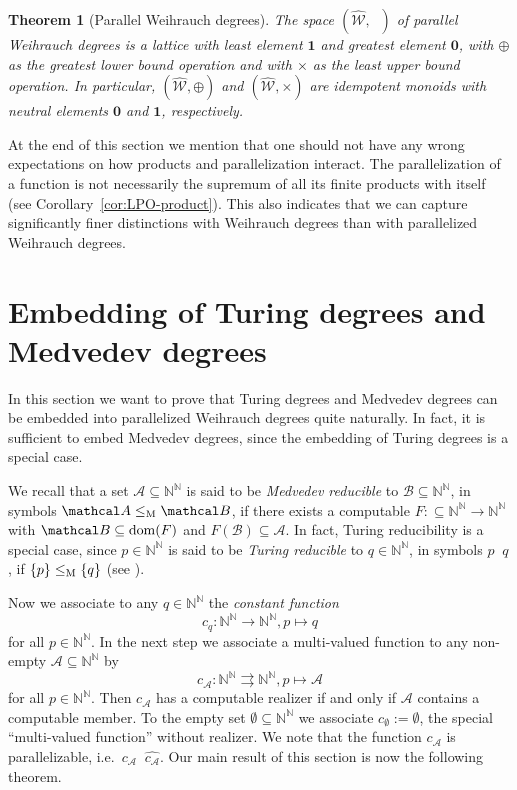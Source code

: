 \documentclass[jsl,10pt]{noasl}
\def\AA{{\mathcal A}}
\def\BB{{\mathcal B}}
\def\WW{{\mathcal W}}
\def\IN{{\mathbb{N}}}
\def\In{\subseteq}
\def\mto{\rightrightarrows}
\def\dom{{\rm dom}}
\def\leqT{\mathop{\leq_{\mathrm{T}}}}
\def\equivW{\mathop{\equiv_{\mathrm{W}}}}
\def\leqPW{\mathop{\leq_{\widehat{\mathrm{W}}}}}
\def\topW{\mathbf{0}}
\def\botW{\mathbf{1}}
\def\emptyW{\boldsymbol{\emptyset}}
\newtheorem{theorem}[proposition]{Theorem}
\begin{document}
\begin{theorem}[Parallel Weihrauch degrees]
\label{thm:Weihrauch-parallel}
The space $(\widehat{\WW},\leqPW)$ of parallel Weihrauch degrees is a lattice with least element $\botW$
and greatest element $\topW$, with $\oplus$ as the greatest lower bound operation
and with $\times$ as the least upper bound operation.
In particular, $(\widehat{\WW},\oplus)$ and $(\widehat{\WW},\times)$ are idempotent monoids 
with neutral elements $\topW$ and $\botW$, respectively.
\end{theorem}

At the end of this section we mention that one should not have any wrong
expectations on how products and parallelization interact.
The parallelization of a function is not necessarily the supremum
of all its finite products with itself (see Corollary~\ref{cor:LPO-product}).
This also indicates that we can capture significantly finer distinctions
with Weihrauch degrees than with parallelized Weihrauch degrees.


\section{Embedding of Turing degrees and Medvedev degrees}
\label{sec:embedding}

In this section we want to prove that Turing degrees and Medvedev degrees
can be embedded into parallelized Weihrauch degrees quite naturally.
In fact, it is sufficient to embed Medvedev degrees, since the embedding
of Turing degrees is a special case.

We recall that a set $\AA\In\IN^\IN$ is said to be {\it Medvedev reducible} to $\BB\In\IN^\IN$, in symbols
$\AA\leq_{\rm M}\BB$, if there 
exists a computable $F:\In\IN^\IN\to\IN^\IN$ with $\BB\In\dom(F)$ and $F(\BB)\In\AA$.
In fact, Turing reducibility is a special case, since $p\in\IN^\IN$ is said to be
{\em Turing reducible} to $q\in\IN^\IN$, in symbols $p\leqT q$, if $\{p\}\leq_{\rm M}\{q\}$
(see \cite{Rog67}). 

Now we associate to any $q\in\IN^\IN$ the {\em constant function} 
\[c_q:\IN^\IN\to\IN^\IN, p\mapsto q\]
for all $p\in\IN^\IN$. 
In the next step we associate a multi-valued function to any non-empty $\AA\In\IN^\IN$ by
\[c_\AA:\IN^\IN\mto\IN^\IN,p\mapsto\AA\]
for all $p\in\IN^\IN$. Then $c_\AA$ has a computable realizer if and only
if $\AA$ contains a computable member.
To the empty set $\emptyset\In\IN^\IN$ we associate $c_\emptyset:=\emptyW$, the
special ``multi-valued function'' without realizer.
We note that the function $c_\AA$ is parallelizable, i.e.\ $c_\AA\equivW\widehat{c_\AA}$.
Our main result of this section is now the following theorem.
\end{document}
